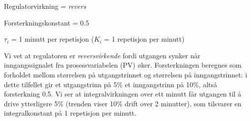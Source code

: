 
Regulatorvirkning = {\it revers}
 
\vskip 10pt

Forsterkningskonstant = 0.5
 
\vskip 10pt

$\tau_i$ = 1 minutt per repetisjon ($K_i$ = 1 repetisjon per minutt)
 






Vi vet at regulatoren er {\it reversvirkende} fordi utgangen synker når inngangssignalet fra prosessvariabelen (PV) øker. Forsterkningen beregnes som forholdet mellom størrelsen på utgangstrinnet og størrelsen på inngangstrinnet: i dette tilfellet gir et utgangstrinn på 5\% et inngangstrinn på 10\%, altså forsterkning 0.5. Vi ser at integralvirkningen over ett minutt får utgangen til å drive ytterligere 5\% (trenden viser 10\% drift over 2 minutter), som tilsvarer en integralkonstant på 1 repetisjon per minutt.


